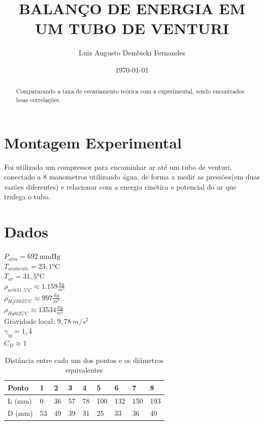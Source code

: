 \documentclass[12pt, a4]{article}
\begin{document}
\title{BALANÇO DE ENERGIA EM UM TUBO DE VENTURI}
\author{Luiz Augusto Dembicki Fernandes}
\date{\today}

\maketitle

\begin{abstract}
Compararando a taxa de esvaziamento teórica com a experimental, sendo encontrados boas correlações. 
\end{abstract}

\section{Montagem Experimental}

\tab  Foi utilizado um compressor para encaminhar ar até um tubo de venturi, 
conectado a 8 manometros utilizando água, de forma a medir as pressões(em duas vazões diferentes)
e relacionar com a energia cinética e potencial do ar que trafega o tubo.

\section{Dados}
$ P_{atm} = 692 \ \si{\mmHg} $ \\
$ T_{ambiente} =  23,1 \si{\celsius} $ \\
$ T_{ar} =  31,5 \si{\celsius} $ \\
$ \rho_{ar@31,5 \si{\celsius}} \approx 1.159 \frac{\si{kg}}{\si{m}^3} $ \\
$ \rho_{H_2O@25 \si{\celsius}} \approx 997 \frac{\si{kg}}{\si{m}^3} $ \\
$ \rho_{Hg@25 \si{\celsius}} \approx 13534 \frac{\si{kg}}{\si{m}^3} $ \\
Gravidade local: $ 9,78 \ m/s^2 $ \\
$ \gamma_{ig} = 1,4 $ \\
$ C_D \approx 1 $
\begin{table}[H]
        \begin{tabular}{|l|l|l|l|l|l|l|l|l|}
        \hline
        Ponto  & 1  & 2  & 3  & 4  & 5   & 6   & 7   & 8   \\ \hline
        L (mm) & 0  & 36 & 57 & 78 & 100 & 132 & 150 & 193 \\ \hline
        D (mm) & 53 & 49 & 39 & 31 & 25  & 33  & 36  & 40  \\ \hline
        \end{tabular}
    \caption{Distância entre cada um dos pontos e os diâmetros equivalentes}
\end{table}
\end{document}
